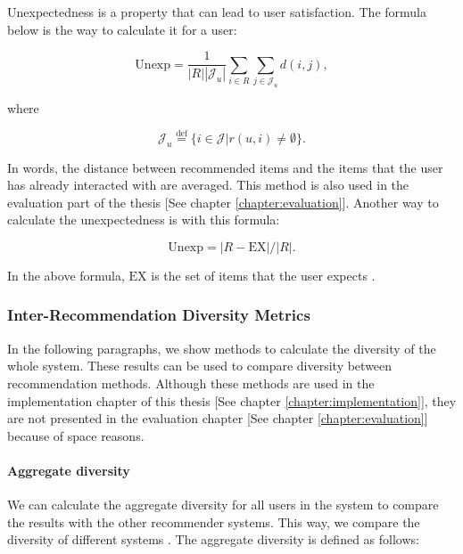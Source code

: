 Unexpectedness is a property that can lead to user satisfaction. The formula below is the way to calculate it for a user:

\begin{equation}
\mathrm {Unexp} = \frac { 1 } { | R | \left| \mathcal { J } _ { u } \right| } \sum _ { i \in R } \sum _ { j \in \mathcal { J } _ { u } } d ( i , j ) ,
\label{eq:unexp}
\end{equation}


where 

\begin{equation}
\mathcal { J } _ { u } \stackrel { \mathrm { def } } { = } \{ i \in \mathcal { J } | r ( u , i ) \neq \emptyset \} .
\label{eq:unexp-set}
\end{equation}

In words, the distance between recommended items and the items that the user has already interacted with are averaged. This method is also used in the evaluation part of the thesis [See chapter \ref{chapter:evaluation}]. Another way to calculate the unexpectedness is with this formula: 

\begin{equation}
\mathrm {Unexp} = | R - \mathrm {EX} | / | R | .
\label{eq:unexp-2}
\end{equation}

In the above formula, $\mathrm {EX}$ is the set of items that the user expects \cite{castells2015novelty}.

\subsubsection{Inter-Recommendation Diversity Metrics}

In the following paragraphs, we show methods to calculate the diversity of the whole system. These results can be used to compare diversity between recommendation methods. Although these methods are used in the implementation chapter of this thesis [See chapter \ref{chapter:implementation}], they are not presented in the evaluation chapter [See chapter \ref{chapter:evaluation}] because of space reasons.

\paragraph{Aggregate diversity}

We can calculate the aggregate diversity for all users in the system to compare the results with the other recommender systems. This way, we compare the diversity of different systems \cite{castells2015novelty}. The aggregate diversity is defined as follows:

